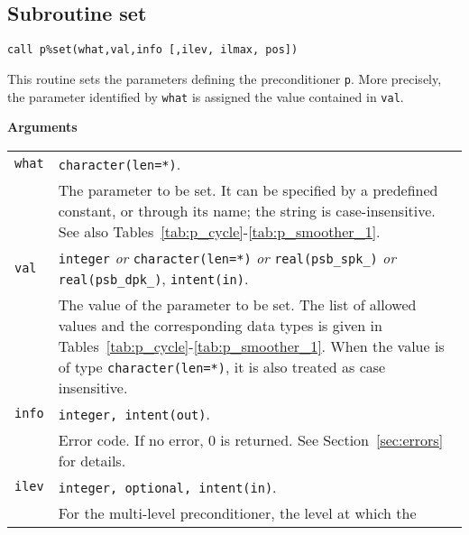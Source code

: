 \clearpage

\subsection{Subroutine set\label{sec:precset}}

\begin{center}
\verb|call p%set(what,val,info [,ilev, ilmax, pos])|
\end{center}

\noindent
This routine sets the parameters defining the preconditioner \verb|p|. More
precisely, the parameter identified by \verb|what| is assigned the value
contained in \verb|val|. 

{\baselineskip\noindent\large\bfseries Arguments} \smallskip

\begin{tabular}{p{1.2cm}p{12cm}}
\verb|what|   & \verb|character(len=*)|. \\
              & The parameter to be set. It can be specified by 
                a predefined constant, or through its name; the string
                is case-insensitive. See also
                Tables~\ref{tab:p_cycle}-\ref{tab:p_smoother_1}.\\ 
\verb|val |   & \verb|integer| \emph{or} \verb|character(len=*)| \emph{or}
                \verb|real(psb_spk_)| \emph{or} \verb|real(psb_dpk_)|,
                \verb|intent(in)|.\\
              & The value of the parameter to be set. The list of allowed
                values and the corresponding data types is given in
                Tables~\ref{tab:p_cycle}-\ref{tab:p_smoother_1}.
                When the value is of type \verb|character(len=*)|,
                it is also treated as case insensitive.\\
\verb|info|   & \verb|integer, intent(out)|.\\
              & Error code. If no error, 0 is returned. See Section~\ref{sec:errors}
                for details.\\
\verb|ilev|   & \verb|integer, optional, intent(in)|.\\
              & For the multi-level preconditioner, the level at which the

\end{tabular}
